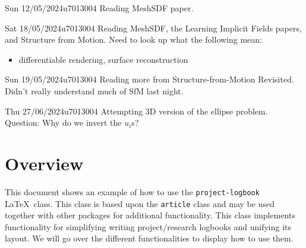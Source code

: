 \documentclass{project-logbook}
\begin{document}

\MakeFrontPage



\newpage

\begin{MeetingMinutes}{Sun 12/05/2024}{u7013004}
	Reading MeshSDF paper.
\end{MeetingMinutes}

\begin{MeetingMinutes}{Sat 18/05/2024}{u7013004}
	Reading MeshSDF, the Learning Implicit Fields papers, and Structure from Motion. Need to look up what the following mean:
	\begin{itemize}
		\item differentiable rendering, surface reconstruction
	\end{itemize}
\end{MeetingMinutes}

\begin{MeetingMinutes}{Sun 19/05/2024}{u7013004}
	Reading more from Structure-from-Motion Revisited. Didn't really understand much of SfM last night.
\end{MeetingMinutes}

\begin{MeetingMinutes}{Thu 27/06/2024}{u7013004}
	Attempting 3D version of the ellipse problem. \\
	Question: Why do we invert the $u_i$s?
\end{MeetingMinutes}


\section{Overview} \label{sec:overview}
	This document shows an example of how to use the \texttt{project-logbook} \LaTeX~class. This class is based upon the \texttt{article} class and may be used together with other packages for additional functionality. This class implements functionality for simplifying writing project/research logbooks and unifying its layout. We will  go over the different functionalities to display how to use them.
\end{document}
